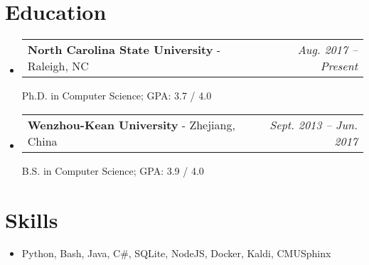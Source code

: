\documentclass[letterpaper,11pt]{article}
\makeatletter
\newcommand{\resumeSubheading}[3]{
    \vspace{-1pt}\item
      \begin{tabular*}{0.97\textwidth}{l@{\extracolsep{\fill}}r}
        \textbf{#1} - #2  & \textit{\small #3}
      \end{tabular*}\vspace{-5pt}
  }
\newcommand{\resumeSubHeadingListStart}{\begin{itemize}[label={},leftmargin=*]}
\newcommand{\resumeSubHeadingListEnd}{\end{itemize}}
\makeatother
\begin{document}
  
  \section{Education}
    \resumeSubHeadingListStart
      \resumeSubheading
        {North Carolina State University}{Raleigh, NC}
        {Aug. 2017 -- Present}
        
        Ph.D. in Computer Science;  GPA: 3.7 / 4.0
      \resumeSubheading
        {Wenzhou-Kean University}{Zhejiang, China}
        {Sept. 2013 -- Jun. 2017}
  
        B.S. in Computer Science; GPA: 3.9 / 4.0
    \resumeSubHeadingListEnd
  
  \section{Skills}
   \resumeSubHeadingListStart
     \item{
       {Python, Bash, Java, C\#, SQLite, NodeJS, Docker, Kaldi, CMU\-Sphinx}}
   \resumeSubHeadingListEnd
  
  
\end{document}
